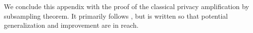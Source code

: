 We conclude this appendix with the proof of the classical privacy amplification by subsampling theorem. It primarily follows \cite{jon}, but is written so that potential generalization and improvement are in reach.
\DPsubsamplerep*

